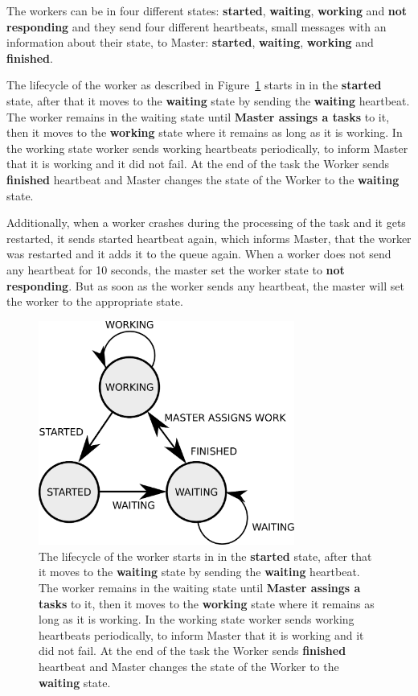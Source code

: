 The workers can be in four different states:
  \textbf{started}, \textbf{waiting}, \textbf{working} and \textbf{not responding}
  and they send four different heartbeats, small messages with an information about their state, to Master:
  \textbf{started}, \textbf{waiting}, \textbf{working} and \textbf{finished}.

The lifecycle of the worker as described in Figure~\ref{fig:worker-state} starts in in the \textbf{started} state,
  after that it moves to the \textbf{waiting} state by sending the \textbf{waiting} heartbeat.
The worker remains in the waiting state until \textbf{Master assings a tasks} to it,
  then it moves to the \textbf{working} state
  where it remains as long as it is working.
In the working state worker sends working heartbeats periodically,
  to inform Master that it is working and it did not fail.
At the end of the task the Worker sends \textbf{finished} heartbeat
  and Master changes the state of the Worker to the \textbf{waiting} state.

Additionally, when a worker crashes during the processing of the task and it gets restarted,
  it sends started heartbeat again,
  which informs Master, that the worker was restarted and it adds it to the queue again.
When a worker does not send any heartbeat for 10 seconds,
  the master set the worker state to \textbf{not responding}.
But as soon as the worker sends any heartbeat,
  the master will set the worker to the appropriate state.

\begin{figure}[h]
  \centering
  \includegraphics[width=0.75\textwidth]{./img/worker-state.pdf}

  \caption{
    The lifecycle of the worker starts in in the \textbf{started} state,
      after that it moves to the \textbf{waiting} state by sending the \textbf{waiting} heartbeat.
    The worker remains in the waiting state until \textbf{Master assings a tasks} to it,
      then it moves to the \textbf{working} state
      where it remains as long as it is working.
    In the working state worker sends working heartbeats periodically,
      to inform Master that it is working and it did not fail.
    At the end of the task the Worker sends \textbf{finished} heartbeat
      and Master changes the state of the Worker to the \textbf{waiting} state.
  }
  \label{fig:worker-state}
\end{figure}

